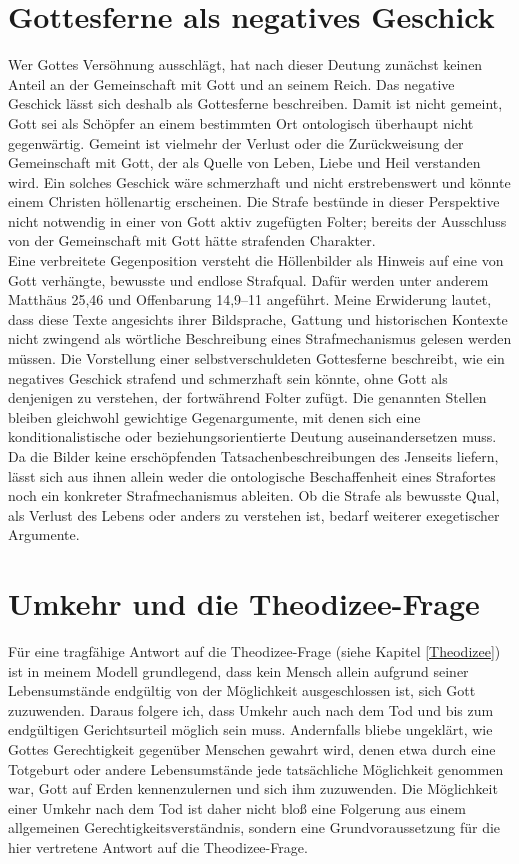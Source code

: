 \section{Gottesferne als negatives Geschick}

Wer Gottes Versöhnung ausschlägt, hat nach dieser Deutung zunächst keinen Anteil an der Gemeinschaft mit Gott und an seinem Reich. Das negative Geschick lässt sich deshalb als Gottesferne beschreiben. Damit ist nicht gemeint, Gott sei als Schöpfer an einem bestimmten Ort ontologisch überhaupt nicht gegenwärtig. Gemeint ist vielmehr der Verlust oder die Zurückweisung der Gemeinschaft mit Gott, der als Quelle von Leben, Liebe und Heil verstanden wird. Ein solches Geschick wäre schmerzhaft und nicht erstrebenswert und könnte einem Christen höllenartig erscheinen. Die Strafe bestünde in dieser Perspektive nicht notwendig in einer von Gott aktiv zugefügten Folter; bereits der Ausschluss von der Gemeinschaft mit Gott hätte strafenden Charakter.
\\

Eine verbreitete Gegenposition versteht die Höllenbilder als Hinweis auf eine von Gott verhängte, bewusste und endlose Strafqual. Dafür werden unter anderem Matthäus 25,46 und Offenbarung 14,9--11 angeführt. Meine Erwiderung lautet, dass diese Texte angesichts ihrer Bildsprache, Gattung und historischen Kontexte nicht zwingend als wörtliche Beschreibung eines Strafmechanismus gelesen werden müssen. Die Vorstellung einer selbstverschuldeten Gottesferne beschreibt, wie ein negatives Geschick strafend und schmerzhaft sein könnte, ohne Gott als denjenigen zu verstehen, der fortwährend Folter zufügt. Die genannten Stellen bleiben gleichwohl gewichtige Gegenargumente, mit denen sich eine konditionalistische oder beziehungsorientierte Deutung auseinandersetzen muss. Da die Bilder keine erschöpfenden Tatsachenbeschreibungen des Jenseits liefern, lässt sich aus ihnen allein weder die ontologische Beschaffenheit eines Strafortes noch ein konkreter Strafmechanismus ableiten. Ob die Strafe als bewusste Qual, als Verlust des Lebens oder anders zu verstehen ist, bedarf weiterer exegetischer Argumente.

\section{Umkehr und die Theodizee-Frage}

Für eine tragfähige Antwort auf die Theodizee-Frage (siehe Kapitel \ref{Theodizee}) ist in meinem Modell grundlegend, dass kein Mensch allein aufgrund seiner Lebensumstände endgültig von der Möglichkeit ausgeschlossen ist, sich Gott zuzuwenden. Daraus folgere ich, dass Umkehr auch nach dem Tod und bis zum endgültigen Gerichtsurteil möglich sein muss. Andernfalls bliebe ungeklärt, wie Gottes Gerechtigkeit gegenüber Menschen gewahrt wird, denen etwa durch eine Totgeburt oder andere Lebensumstände jede tatsächliche Möglichkeit genommen war, Gott auf Erden kennenzulernen und sich ihm zuzuwenden. Die Möglichkeit einer Umkehr nach dem Tod ist daher nicht bloß eine Folgerung aus einem allgemeinen Gerechtigkeitsverständnis, sondern eine Grundvoraussetzung für die hier vertretene Antwort auf die Theodizee-Frage.
\\

